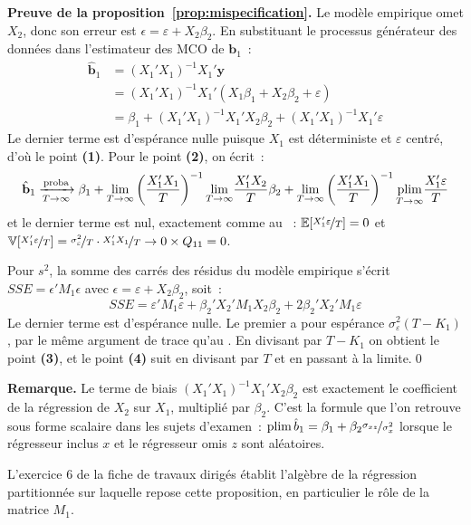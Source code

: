 \documentclass[10pt]{beamer}
\begin{document}
\begin{notes}

  \textbf{Preuve de la proposition~\ref{prop:mispecification}.} Le modèle empirique
  omet $X_2$, donc son erreur est $\epsilon = \varepsilon + X_2\beta_2$. En substituant
  le processus générateur des données dans l'estimateur des MCO de $\mathbf b_1$~:
  \[
    \begin{split}
      \hat{\mathbf b}_1 &= (X_1'X_1)^{-1}X_1'\mathbf y\\
                        &= (X_1'X_1)^{-1}X_1'\left( X_1\beta_1 + X_2\beta_2 + \varepsilon \right)\\
                        &= \beta_1 + (X_1'X_1)^{-1}X_1'X_2\beta_2 + (X_1'X_1)^{-1}X_1'\varepsilon
    \end{split}
  \]
  Le dernier terme est d'espérance nulle puisque $X_1$ est déterministe et
  $\varepsilon$ centré, d'où le point \textbf{(1)}. Pour le point \textbf{(2)}, on
  écrit~:
  \[
    \hat{\mathbf b}_1 \xrightarrow[T\rightarrow\infty]{\text{proba}} \beta_1
      + \underset{T\to\infty}{\lim}\left(\frac{X_1'X_1}{T}\right)^{-1}
        \underset{T\to\infty}{\lim}\frac{X_1'X_2}{T}\beta_2
      + \underset{T\to\infty}{\lim}\left(\frac{X_1'X_1}{T}\right)^{-1}
        \underset{T\to\infty}{\text{plim}}\frac{X_1'\varepsilon}{T}
  \]
  et le dernier terme est nul, exactement comme au ~:
  $\mathbb E[\nicefrac{X_1'\varepsilon}{T}]=0$ et
  $\mathbb V[\nicefrac{X_1'\varepsilon}{T}] = \nicefrac{\sigma_{\varepsilon}^2}{T}\cdot\nicefrac{X_1'X_1}{T}
  \rightarrow 0\times Q_{11} = 0$.\newline

  Pour $s^2$, la somme des carrés des résidus du modèle empirique s'écrit
  $SSE = \epsilon'M_1\epsilon$ avec $\epsilon = \varepsilon + X_2\beta_2$, soit~:
  \[
    SSE = \varepsilon'M_1\varepsilon
        + \beta_2'X_2'M_1X_2\beta_2
        + 2\beta_2'X_2'M_1\varepsilon
  \]
  Le dernier terme est d'espérance nulle. Le premier a pour espérance
  $\sigma_{\varepsilon}^2(T-K_1)$, par le même argument de trace qu'au
  . En divisant par $T-K_1$ on obtient le point \textbf{(3)}, et le
  point \textbf{(4)} suit en divisant par $T$ et en passant à la limite.\qed

  \bigskip

  \textbf{Remarque.} Le terme de biais $(X_1'X_1)^{-1}X_1'X_2\beta_2$ est exactement
  le coefficient de la régression de $X_2$ sur $X_1$, multiplié par $\beta_2$. C'est
  la formule que l'on retrouve sous forme scalaire dans les sujets d'examen~:
  $\text{plim}\,\hat b_1 = \beta_1 + \beta_2\nicefrac{\sigma_{xz}}{\sigma_x^2}$ lorsque
  le régresseur inclus $x$ et le régresseur omis $z$ sont aléatoires.\newline

  L'exercice 6 de la fiche de travaux dirigés établit l'algèbre de la régression
  partitionnée sur laquelle repose cette proposition, en particulier le rôle de la
  matrice $M_1$.

\end{notes}
\end{document}
